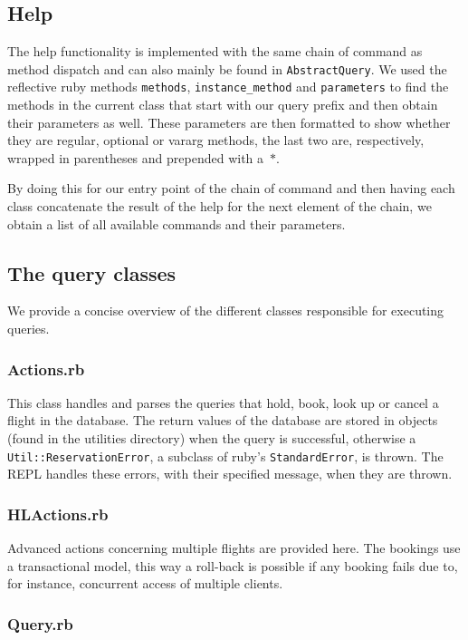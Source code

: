 \documentclass[11pt,pdftex,oneside]{article}
\begin{document}
\subsection{Help}
The help functionality is implemented with the same chain of command as
method dispatch and can also mainly be found in {\tt AbstractQuery}.
We used the reflective ruby methods {\tt methods}, {\tt instance\_method}
and {\tt parameters} to find the methods in the current class that start
with our query prefix and then obtain their parameters as well.
These parameters are then formatted to show whether they are regular,
optional or vararg methods, the last two are, respectively, wrapped in
parentheses and prepended with a~{\tt $\displaystyle\ast$}.

By doing this for our entry point of the chain of command and then having
each class concatenate the result of the help for the next element of
the chain, we obtain a list of all available commands and their
parameters.

\subsection{The query classes}
We provide a concise overview of the different classes responsible for
executing queries.
\subsubsection{Actions.rb}

This class handles and parses the queries that hold, book, look up or
cancel a flight in the database.
The return values of the database are stored in objects (found in
the utilities directory) when the query is successful, otherwise a
{\tt Util::ReservationError}, a subclass of ruby's {\tt StandardError}, is
thrown.
The REPL handles these errors, with their specified message, when they are
thrown.

\subsubsection{HLActions.rb}

Advanced actions concerning multiple flights are provided here.
The bookings use a transactional model, this way a roll-back is possible
if any booking fails due to, for instance, concurrent access of multiple
clients.

\subsubsection{Query.rb}
\end{document}

